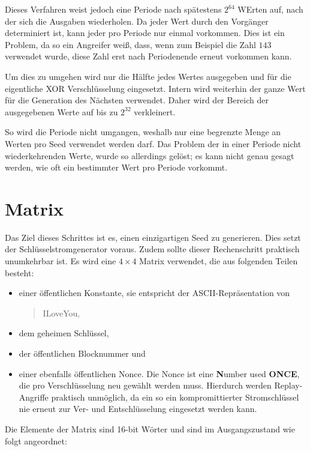 \documentclass[10pt,a4paper]{article}
\begin{document}
\medskip
Dieses Verfahren weist jedoch eine Periode nach spätestens $2^{64}$ WErten auf, nach der sich die Ausgaben wiederholen.
Da jeder Wert durch den Vorgänger determiniert ist, kann jeder pro Periode nur einmal vorkommen.
Dies ist ein Problem, da so ein Angreifer weiß, dass, wenn zum Beispiel die Zahl $143$ verwendet wurde, diese Zahl erst nach Periodenende erneut vorkommen kann.

Um dies zu umgehen wird nur die Hälfte jedes Wertes ausgegeben und für die eigentliche XOR Verschlüsselung eingesetzt.
Intern wird weiterhin der ganze Wert für die Generation des Nächsten verwendet.
Daher wird der Bereich der ausgegebenen Werte auf bis zu $2^{32}$ verkleinert.

So wird die Periode nicht umgangen, weshalb nur eine begrenzte Menge an Werten pro Seed verwendet werden darf.
Das Problem der in einer Periode nicht wiederkehrenden Werte, wurde so allerdings gelöst; es kann nicht genau gesagt werden, wie oft ein bestimmter Wert pro Periode vorkommt.

\section{Matrix}

Das Ziel dieses Schrittes ist es, einen einzigartigen Seed zu generieren.
Dies setzt der Schlüsselstromgenerator voraus.
Zudem sollte dieser Rechenschritt praktisch unumkehrbar ist.
Es wird eine $4 \times 4$ Matrix verwendet, die aus folgenden Teilen besteht:
\begin{itemize}
    \item einer öffentlichen Konstante, sie entspricht der ASCII-Repräsentation von
          \begin{quotation}
              \glqq ILoveYou\grqq{},
          \end{quotation}
    \item dem geheimen Schlüssel,
    \item der öffentlichen Blocknummer und
    \item einer ebenfalls öffentlichen Nonce.
          Die Nonce ist eine \glqq \textbf{N}umber used \textbf{ONCE}\grqq{}, die pro Verschlüsselung neu gewählt werden muss.
          Hierdurch werden Replay-Angriffe praktisch unmöglich, da ein so ein kompromittierter Stromschlüssel nie erneut zur Ver- und Entschlüsselung eingesetzt werden kann.
\end{itemize}

Die Elemente der Matrix sind 16-bit Wörter und sind im Ausgangszustand wie folgt angeordnet:
\end{document}
